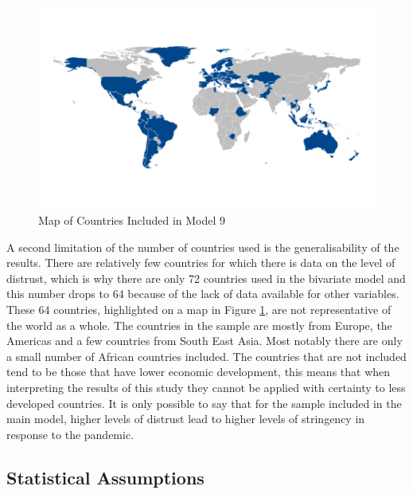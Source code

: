 \documentclass[
  11pt,
]{article}
\begin{document}
\begin{figure}
\includegraphics[width=0.8\linewidth]{write_up_test_files/figure-latex/map-1} \caption{Map of Countries Included in Model 9}\label{fig:map}
\end{figure}

A second limitation of the number of countries used is the generalisability of the results. There are relatively few countries for which there is data on the level of distrust, which is why there are only 72 countries used in the bivariate model and this number drops to 64 because of the lack of data available for other variables. These 64 countries, highlighted on a map in Figure \ref{fig:map}, are not representative of the world as a whole. The countries in the sample are mostly from Europe, the Americas and a few countries from South East Asia. Most notably there are only a small number of African countries included. The countries that are not included tend to be those that have lower economic development, this means that when interpreting the results of this study they cannot be applied with certainty to less developed countries. It is only possible to say that for the sample included in the main model, higher levels of distrust lead to higher levels of stringency in response to the pandemic.\\

\hypertarget{statistical-assumptions}{%
\subsection{Statistical Assumptions}\label{statistical-assumptions}}
\end{document}
